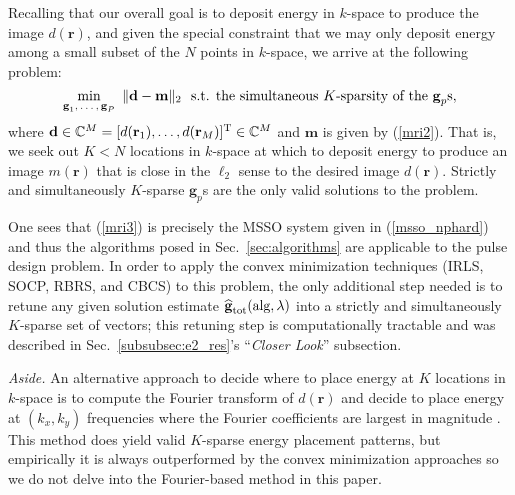 \documentclass[final]{siamltex}
\newcommand{\field}[1]{\mathbb{#1}}
\newcommand{\la}[1]{\mbox{$\mathbf{#1}$}}  \newcommand{\sst}[1]{\mbox{\scriptsize{#1}}}
\begin{document}
   Recalling that our overall goal is to deposit energy in $k$-space
   to produce the image $d(\la{r})$, and given the special constraint that we
   may only deposit energy among a small subset of the $N$ points in
   $k$-space, we arrive at the following problem:
   \begin{equation}\label{mri3}
         \mathop{\mbox{min}}_{\sst{$\la{g}_1, \ldots, \la{g}_P$}} 
            \mbox{ } \Vert \la{d} - \la{m} \Vert_2 \,\,
            \mbox{ s.t. the simultaneous $K$-sparsity of the $\la{g}_p$s},
   \end{equation}
   where $\la{d} \in \field{C}^{M} = [d(\la{r}_1), \ldots,
   d(\la{r}_M)]^{\sst{T}} \in \field{C}^{M}$ and $\la{m}$ is given by
   (\ref{mri2}).  That is, we seek out $K < N$ locations in $k$-space
   at which to deposit energy to produce an image $m(\la{r})$ that is
   close in the $\ell_2$ sense to the desired image $d(\la{r})$.
   Strictly and simultaneously $K$-sparse $\la{g}_p$s are the
   only valid solutions to the problem.

   One sees that (\ref{mri3}) is precisely the MSSO system given in
   (\ref{msso_nphard}) and thus the algorithms posed in
   Sec.~\ref{sec:algorithms} are applicable to the pulse design
   problem.  In order to apply the convex minimization techniques
   (IRLS, SOCP, RBRS, and CBCS) to this problem, the only additional
   step needed is to retune any given solution estimate
   $\widehat{\la{g}}_{\sst{tot}}(\mbox{alg},\lambda)$ into a strictly
   and simultaneously $K$-sparse set of vectors; this retuning step is
   computationally tractable and was described in
   Sec.~\ref{subsubsec:e2_res}'s ``{\em{Closer Look}}'' subsection.

   {\em{Aside}.} An alternative approach to decide where to place
   energy at $K$ locations in $k$-space is to compute the Fourier
   transform of $d(\la{r})$ and decide to place energy at $(k_x, k_y)$
   frequencies where the Fourier coefficients are largest in magnitude
   \cite{Yip2006}.  This method does yield valid $K$-sparse energy
   placement patterns, but empirically it is always outperformed by
   the convex minimization approaches \cite{Zel2007, Zel2008_CISS,
   Zel2008_TMI} so we do not delve into the Fourier-based method in
   this paper.
\end{document}
